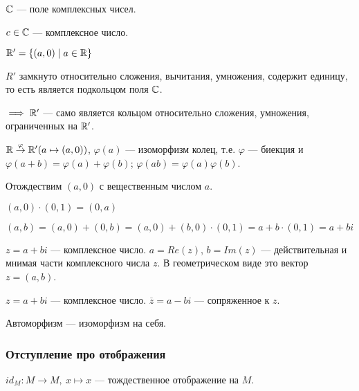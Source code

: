 \begin{defn}
    $\mathbb{C}$ --- поле комплексных чисел.
\end{defn}

\begin{defn}
    $c \in \mathbb{C}$ --- комплексное число.
\end{defn}

\begin{theorem-non}
    
    $\mathbb{R}' = \{(a, 0) \mid a \in \mathbb{R}\}$
    
    $R'$ замкнуто относительно сложения, вычитания, умножения, содержит единицу, то есть является подкольцом поля $\mathbb{C}$.
    
    $\implies \mathbb{R}'$ --- само является кольцом относительно сложения, умножения, ограниченных на $\mathbb{R}'$. 
    
    $\mathbb{R} \overset{\varphi}{\to} \mathbb{R}'(a \mapsto (a, 0))$, $\varphi(a)$ --- изоморфизм колец, т.е. $\varphi$ --- биекция и $\varphi(a + b) = \varphi(a) + \varphi(b)$; $\varphi(ab) = \varphi(a)\varphi(b)$.
    
    Отождествим $(a, 0)$ с вещественным числом $a$.
    
    $(a, 0) \cdot (0, 1) = (0, a)$
    
    $(a, b) = (a, 0) + (0, b) = (a, 0) + (b, 0) \cdot (0, 1) = a + b \cdot (0, 1) = a + bi$
\end{theorem-non}

\begin{defn}
    $z = a + bi$ --- комплексное число.
    $a = Re(z)$, $b = Im(z)$ --- действительная и мнимая части комплексного числа $z$.
    В геометрическом виде это вектор $z = (a, b)$.
\end{defn}

\begin{defn}
    $z = a + bi$ --- комплексное число. 
    $\overline{z} = a - bi$ --- сопряженное к $z$.
\end{defn}

\begin{defn}
    Автоморфизм --- изоморфизм на себя.
\end{defn}

\subsubsection*{Отступление про отображения}

\begin{defn}
    $id_M: M \to M,~x \mapsto x$ --- тождественное отображение на $M$.
\end{defn}


